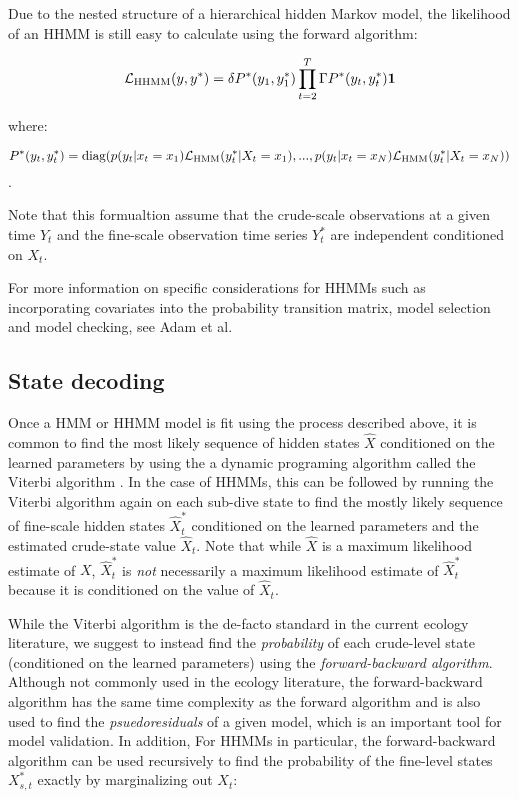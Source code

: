 Due to the nested structure of a hierarchical hidden Markov model, the likelihood of an HHMM is still easy to calculate using the forward algorithm:

$$\mathcal{L}_{\text{HHMM}}(y,y^*) = \delta P^*(y_1,y_1^*) \prod_{t=2}^T \Gamma P^*(y_t,y_t^*) \mathbf{1}$$

where:

$$P^*(y_t,y^*_t) = \text{diag}(p(y_t|x_t = x_1)\mathcal{L}_{\text{HMM}}(y_t^*|X_t = x_1), . . . , p(y_t|x_t = x_N )\mathcal{L}_{\text{HMM}}(y_t^*|X_t = x_N))$$.

Note that this formualtion assume that the crude-scale observations at a given time $Y_t$ and the fine-scale observation time series $Y_t^*$ are independent conditioned on $X_t$.

For more information on specific considerations for HHMMs such as incorporating covariates into the probability transition matrix, model selection and model checking, see Adam et al. \cite{Adam:2019}

\subsection{State decoding}

Once a HMM or HHMM model is fit using the process described above, it is common to find the most likely sequence of hidden states $\hat X$ conditioned on the learned parameters by using the a dynamic programing algorithm called the Viterbi algorithm \cite{Viterbi:1967}. In the case of HHMMs, this can be followed by running the Viterbi algorithm again on each sub-dive state to find the mostly likely sequence of fine-scale hidden states $\hat X_t^*$ conditioned on the learned parameters and the estimated crude-state value $\hat X_t$. Note that while $\hat X$ is a maximum likelihood estimate of $X$, $\hat X^*_t$ is \textit{not} necessarily a maximum likelihood estimate of $\hat X^*_t$ because it is conditioned on the value of $\hat X_t$.

While the Viterbi algorithm is the de-facto standard in the current ecology literature, we suggest to instead find the \textit{probability} of each crude-level state (conditioned on the learned parameters) using the \textit{forward-backward algorithm}. Although not commonly used in the ecology literature, the forward-backward algorithm has the same time complexity as the forward algorithm and is also used to find the \textit{psuedoresiduals} of a given model, which is an important tool for model validation. In addition, For HHMMs in particular, the forward-backward algorithm can be used recursively to find the probability of the fine-level states $X^*_{s,t}$ exactly by marginalizing out $X_t$:

